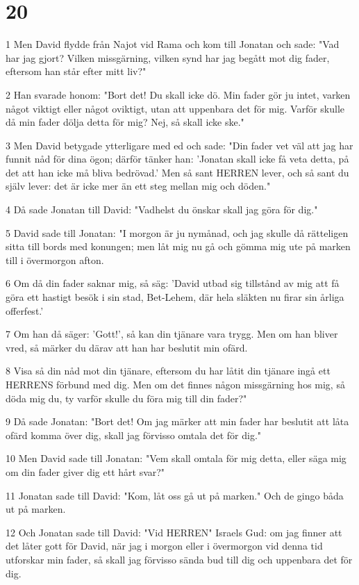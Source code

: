 \chapter{20}

\par 1 Men David flydde från Najot vid Rama och kom till Jonatan och sade: "Vad har jag gjort? Vilken missgärning, vilken synd har jag begått mot dig fader, eftersom han står efter mitt liv?"
\par 2 Han svarade honom: "Bort det! Du skall icke dö. Min fader gör ju intet, varken något viktigt eller något oviktigt, utan att uppenbara det för mig. Varför skulle då min fader dölja detta för mig? Nej, så skall icke ske."
\par 3 Men David betygade ytterligare med ed och sade: "Din fader vet väl att jag har funnit nåd för dina ögon; därför tänker han: 'Jonatan skall icke få veta detta, på det att han icke må bliva bedrövad.' Men så sant HERREN lever, och så sant du själv lever: det är icke mer än ett steg mellan mig och döden."
\par 4 Då sade Jonatan till David: "Vadhelst du önskar skall jag göra för dig."
\par 5 David sade till Jonatan: "I morgon är ju nymånad, och jag skulle då rätteligen sitta till bords med konungen; men låt mig nu gå och gömma mig ute på marken till i övermorgon afton.
\par 6 Om då din fader saknar mig, så säg: 'David utbad sig tillstånd av mig att få göra ett hastigt besök i sin stad, Bet-Lehem, där hela släkten nu firar sin årliga offerfest.'
\par 7 Om han då säger: 'Gott!', så kan din tjänare vara trygg. Men om han bliver vred, så märker du därav att han har beslutit min ofärd.
\par 8 Visa så din nåd mot din tjänare, eftersom du har låtit din tjänare ingå ett HERRENS förbund med dig. Men om det finnes någon missgärning hos mig, så döda mig du, ty varför skulle du föra mig till din fader?"
\par 9 Då sade Jonatan: "Bort det! Om jag märker att min fader har beslutit att låta ofärd komma över dig, skall jag förvisso omtala det för dig."
\par 10 Men David sade till Jonatan: "Vem skall omtala för mig detta, eller säga mig om din fader giver dig ett hårt svar?"
\par 11 Jonatan sade till David: "Kom, låt oss gå ut på marken." Och de gingo båda ut på marken.
\par 12 Och Jonatan sade till David: "Vid HERREN" Israels Gud: om jag finner att det låter gott för David, när jag i morgon eller i övermorgon vid denna tid utforskar min fader, så skall jag förvisso sända bud till dig och uppenbara det för dig.

